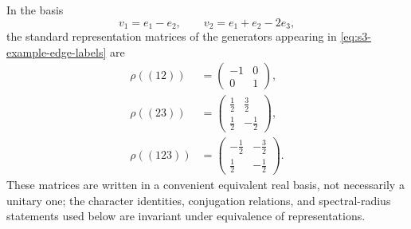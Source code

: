 \documentclass[11pt,a4paper]{amsart}
\theoremstyle{plain}
\theoremstyle{definition}
\theoremstyle{remark}
\begin{document}
In the basis
\[
  v_1=e_1-e_2,\qquad v_2=e_1+e_2-2e_3,
\]
the standard representation matrices of the generators appearing in
\eqref{eq:s3-example-edge-labels} are
\begin{equation}\label{eq:s3-standard-representation-matrices}
\begin{aligned}
  \rho((12))
    &=
    \begin{pmatrix}
      -1 & 0 \\
      0 & 1
    \end{pmatrix}, \\
  \rho((23))
    &=
    \begin{pmatrix}
      \frac12 & \frac32 \\
      \frac12 & -\frac12
    \end{pmatrix}, \\
  \rho((123))
    &=
    \begin{pmatrix}
      -\frac12 & -\frac32 \\
      \frac12 & -\frac12
    \end{pmatrix}.
\end{aligned}
\end{equation}
These matrices are written in a convenient equivalent real basis, not
necessarily a unitary one; the character identities, conjugation
relations, and spectral-radius statements used below are invariant under
equivalence of representations.
\end{document}
